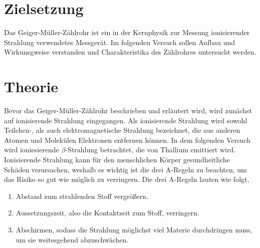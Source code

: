 \section{Zielsetzung}
\label{sec:ziel}
Das Geiger-Müller-Zählrohr ist ein in der Kernphysik zur Messung ionisierender Strahlung verwendetes Messgerät. Im folgenden Versuch sollen Aufbau 
und Wirkunsgweise verstanden und Charakteristika des Zählrohres untersucht werden.

\section{Theorie}
\label{sec:Theorie}

Bevor das Geiger-Müller-Zählrohr beschrieben und erläutert wird, wird zunächst auf ionisierende Strahlung eingegangen.
Als ionisierende Strahlung wird sowohl Teilchen-, als auch elektromagnetische Strahlung bezeichnet, die aus anderen Atomen und Molekülen Elektronen entfernen können.
In dem folgenden Versuch wird ioniesierende $\beta$-Strahlung betrachtet, die von Thallium emittiert wird.
Ionisierende Strahlung kann für den menschlichen Körper gesundheitliche Schäden verursachen, weshalb es wichtig ist die drei A-Regeln zu beachten, um das Risiko so gut wie möglich zu verringern.
Die drei A-Regeln lauten wie folgt,
\begin{enumerate}
    \item Abstand zum strahlenden Stoff vergrößern.
    \item Aussetzungszeit, also die Kontaktzeit zum Stoff, verringern.
    \item Abschirmen, sodass die Strahlung möglichst viel Materie durchdringen muss, um sie weitesgehend abzuschwächen.
\end{enumerate}

